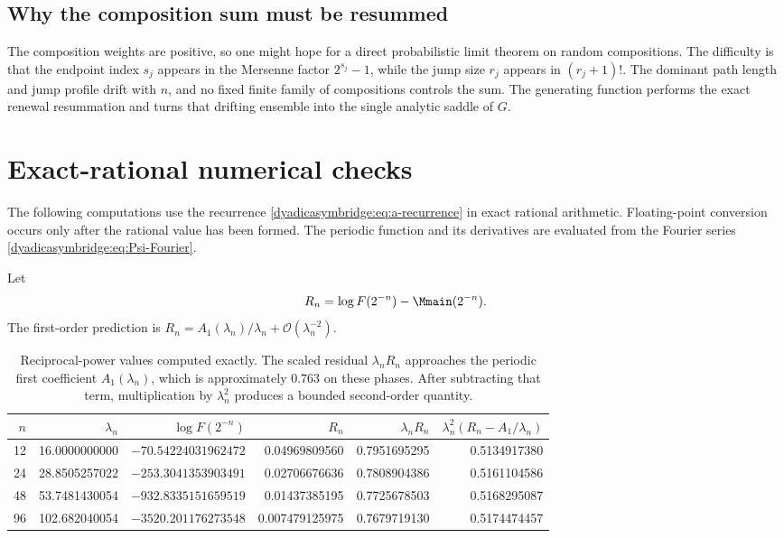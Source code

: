 \documentclass[11pt,oneside]{article}
\theoremstyle{definition}
\theoremstyle{remark}
\newcommand{\bigO}{\mathcal O}
\begin{document}
\subsection{Why the composition sum must be resummed}

The composition weights are positive, so one might hope for a direct probabilistic limit theorem on random compositions.  The difficulty is that the endpoint index $s_j$ appears in the Mersenne factor $2^{s_j}-1$, while the jump size $r_j$ appears in $(r_j+1)!$.  The dominant path length and jump profile drift with $n$, and no fixed finite family of compositions controls the sum.  The generating function performs the exact renewal resummation and turns that drifting ensemble into the single analytic saddle of $G$.

\section{Exact-rational numerical checks}
\label{dyadicasymbridge:sec:numerics}

The following computations use the recurrence \eqref{dyadicasymbridge:eq:a-recurrence} in exact rational arithmetic.  Floating-point conversion occurs only after the rational value has been formed.  The periodic function and its derivatives are evaluated from the Fourier series \eqref{dyadicasymbridge:eq:Psi-Fourier}.

Let
\begin{equation}
 R_n=\log F(2^{-n})-\Mmain(2^{-n}).
\label{dyadicasymbridge:eq:Rn-def}
\end{equation}
The first-order prediction is
$R_n=A_1(\lambda_n)/\lambda_n+\bigO(\lambda_n^{-2})$.

\begin{table}[htbp]
\centering
\small
\begin{tabular}{@{}rrrrrr@{}}
\toprule
$n$ & $\lambda_n$ & $\log F(2^{-n})$ & $R_n$ & $\lambda_nR_n$ &
$\lambda_n^2(R_n-A_1/\lambda_n)$\\
\midrule
12 & 16.0000000000 & $-70.54224031962472$ & 0.04969809560 & 0.7951695295 & 0.5134917380\\
24 & 28.8505257022 & $-253.3041353903491$ & 0.02706676636 & 0.7808904386 & 0.5161104586\\
48 & 53.7481430054 & $-932.8335151659519$ & 0.01437385195 & 0.7725678503 & 0.5168295087\\
96 & 102.682040054 & $-3520.201176273548$ & 0.007479125975 & 0.7679719130 & 0.5174474457\\
\bottomrule
\end{tabular}
\caption{Reciprocal-power values computed exactly.  The scaled residual
$\lambda_nR_n$ approaches the periodic first coefficient $A_1(\lambda_n)$, which is approximately $0.763$ on these phases.  After subtracting that term, multiplication by $\lambda_n^2$ produces a bounded second-order quantity.}
\label{dyadicasymbridge:tab:inverse-numerics}
\end{table}
\end{document}
